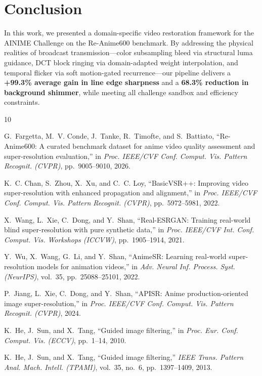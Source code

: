 \documentclass[conference]{IEEEtran}
\begin{document}
\section{Conclusion}
In this work, we presented a domain-specific video restoration framework for the AINIME Challenge on the Re-Anime600 benchmark. By addressing the physical realities of broadcast transmission---color subsampling bleed via structural luma guidance, DCT block ringing via domain-adapted weight interpolation, and temporal flicker via soft motion-gated recurrence---our pipeline delivers a \textbf{+99.3\% average gain in line edge sharpness} and a \textbf{68.3\% reduction in background shimmer}, while meeting all challenge sandbox and efficiency constraints.

\begin{thebibliography}{10}

G.~Fargetta, M.~V. Conde, J.~Tanke, R.~Timofte, and S.~Battiato, ``Re-Anime600: A curated benchmark dataset for anime video quality assessment and super-resolution evaluation,'' in \emph{Proc. IEEE/CVF Conf. Comput. Vis. Pattern Recognit. (CVPR)}, pp.~9005--9010, 2026.

K.~C. Chan, S.~Zhou, X.~Xu, and C.~C. Loy, ``BasicVSR++: Improving video super-resolution with enhanced propagation and alignment,'' in \emph{Proc. IEEE/CVF Conf. Comput. Vis. Pattern Recognit. (CVPR)}, pp.~5972--5981, 2022.

X.~Wang, L.~Xie, C.~Dong, and Y.~Shan, ``Real-ESRGAN: Training real-world blind super-resolution with pure synthetic data,'' in \emph{Proc. IEEE/CVF Int. Conf. Comput. Vis. Workshops (ICCVW)}, pp.~1905--1914, 2021.

Y.~Wu, X.~Wang, G.~Li, and Y.~Shan, ``AnimeSR: Learning real-world super-resolution models for animation videos,'' in \emph{Adv. Neural Inf. Process. Syst. (NeurIPS)}, vol.~35, pp.~25088--25101, 2022.

P.~Jiang, L.~Xie, C.~Dong, and Y.~Shan, ``APISR: Anime production-oriented image super-resolution,'' in \emph{Proc. IEEE/CVF Conf. Comput. Vis. Pattern Recognit. (CVPR)}, 2024.

K.~He, J.~Sun, and X.~Tang, ``Guided image filtering,'' in \emph{Proc. Eur. Conf. Comput. Vis. (ECCV)}, pp.~1--14, 2010.

K.~He, J.~Sun, and X.~Tang, ``Guided image filtering,'' \emph{IEEE Trans. Pattern Anal. Mach. Intell. (TPAMI)}, vol.~35, no.~6, pp.~1397--1409, 2013.


\end{thebibliography}
\end{document}
